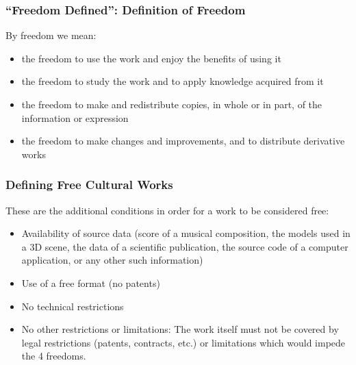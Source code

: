 \documentclass{beamer}
\begin{document}

\begin{frame}
\frametitle{``Freedom Defined'': Definition of Freedom}

By \alert{freedom} we mean:

\begin{itemize}
\item the \alert{freedom to use} the work and enjoy the benefits of using it
\item the \alert{freedom to study} the work and to apply knowledge acquired from it
\item the \alert{freedom to make and redistribute copies}, in whole or in part, of the information or expression
\item the \alert{freedom to make changes and improvements}, and to distribute derivative works 
\end{itemize}                                                 

\end{frame}


\begin{frame}
\frametitle{Defining Free Cultural Works}

These are the additional conditions in order for a work to be considered free:

\begin{itemize}
\item \alert{Availability of source data} (score of a musical composition, the models used in a 3D scene, the data of a scientific publication, the source code of a computer application, or any other such information)
\item \alert{Use of a free format} (no patents)
\item \alert{No technical restrictions}
\item \alert{No other restrictions or limitations:} The work itself must not be covered by legal restrictions (patents, contracts, etc.) or limitations which would impede the 4 freedoms.
\end{itemize}                                                 

\end{frame}


\end{document}
